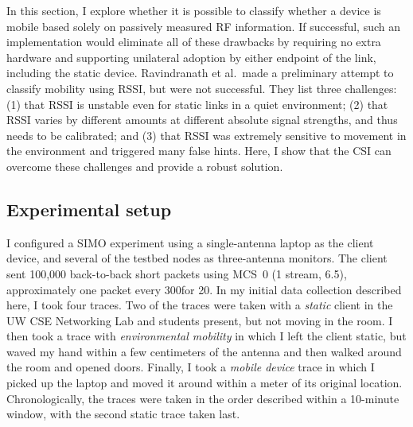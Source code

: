 In this section, I explore whether it is possible to classify whether a device is mobile based solely on passively measured RF information. If successful, such an implementation would eliminate all of these drawbacks by requiring no extra hardware and supporting unilateral adoption by either endpoint of the link, including the static device. Ravindranath et al.\ made a preliminary attempt to classify mobility using RSSI, but were not successful. They list three challenges: (1) that RSSI is unstable even for static links in a quiet environment; (2) that RSSI varies by different amounts at different absolute signal strengths, and thus needs to be calibrated; and (3) that RSSI was extremely sensitive to movement in the environment and triggered many false hints. Here, I show that the CSI can overcome these challenges and provide a robust solution.

\subsection{Experimental setup}
I configured a SIMO experiment using a single-antenna laptop as the client device, and several of the testbed nodes as three-antenna monitors. The client sent 100,000 back-to-back short packets using MCS~0 (1 stream, 6.5\Mbps), approximately one packet every 300\us for 20\s. In my initial data collection described here, I took four traces. Two of the traces were taken with a \emph{static} client in the UW CSE Networking Lab and students present, but not moving in the room. I then took a trace with \emph{environmental mobility} in which I left the client static, but waved my hand within a few centimeters of the antenna and then walked around the room and opened doors. Finally, I took a \emph{mobile device} trace in which I picked up the laptop and moved it around within a meter of its original location. Chronologically, the traces were taken in the order described within a 10-minute window, with the second static trace taken last. 


